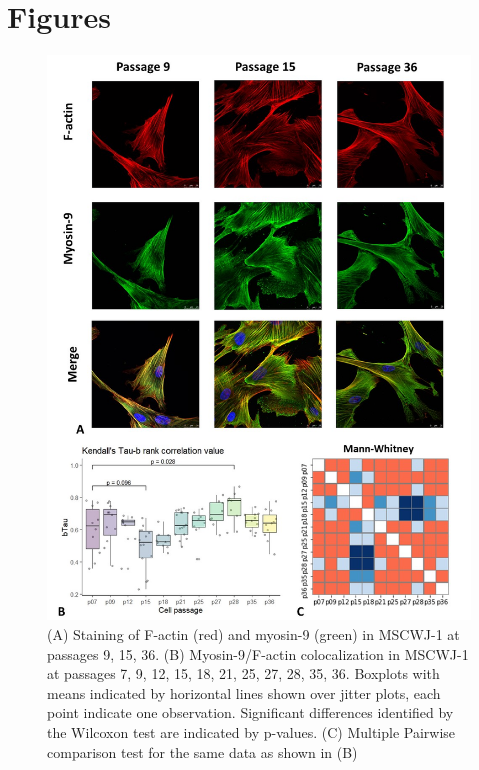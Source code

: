 \documentclass[alpha-refs]{wiley-article}
\begin{document}
\section*{Figures}

\begin{figure}[hbt!]
\centering
\includegraphics[width=0.9\linewidth]{myosin-9.jpg}
\caption{(A) Staining of F-actin (red) and myosin-9 (green) in MSCWJ-1 at passages 9, 15, 36.
(B) Myosin-9/F-actin colocalization in MSCWJ-1 at passages 7, 9, 12, 15, 18, 21, 25, 27, 28, 35, 36. Boxplots with means indicated by horizontal lines shown over jitter plots, each point indicate one observation. Significant differences identified by the Wilcoxon test are indicated by p-values. (C) Multiple Pairwise comparison test for the same data as shown in (B)}
\end{figure}
\end{document}
